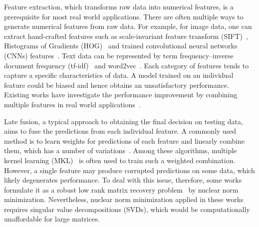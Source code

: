 \documentclass[letterpaper]{article}
\begin{document}
Feature extraction, which transforms raw data into numerical features, is a prerequisite for most real world applications.
There are often multiple ways to generate numerical features from raw data.
For example, for image data, one can extract hand-crafted features such as scale-invariant feature transform
(SIFT)~\cite{loweijcv2004distinctive}, Histograms of Gradients (HOG)~\cite{dalalcvpr2005histograms} and trained convolutional neural networks (CNNs) features~\cite{krizhevskynips2012imagenet}.
Text data can be represented by term frequency–inverse document frequency (tf-idf)~\cite{manning2008introduction} and word2vec~\cite{mikoloviclr2013efficient}.
Each category of features tends to capture a specific characteristics of data.
A model trained on an individual feature could be biased and hence obtains an unsatisfactory performance.
Existing works have investigate the performance improvement by combining multiple features in real world applications~\cite{gehler2009feature,ye2012robust,xuiccv2013feature,lai2015learning}.





Late fusion, a typical approach to obtaining the final decision on testing data, aims to fuse the predictions from each individual feature.
A commonly used method is to learn weights for predictions of each feature and linearly combine them, which has a number of variations~\cite{gehler2009feature,xuiccv2013feature,lai2015learning}.
Among these algorithms, multiple kernel learning (MKL)~\cite{lanckriet2004learning,Rakotomamonjy2008Simplemkl} is often used to train such a weighted combination.
However, a single feature may produce corrupted predictions on some data, which likely degenerates performance.
To deal with this issue, therefore, some works formulate it as a robust low rank matrix recovery problem~\cite{gaoijcai2016robust,ye2012robust} by nuclear norm minimization.
Nevertheless, nuclear norm minimization applied in these works requires singular value decompositions (SVDs), which would be computationally unaffordable for large matrices.
\end{document}
